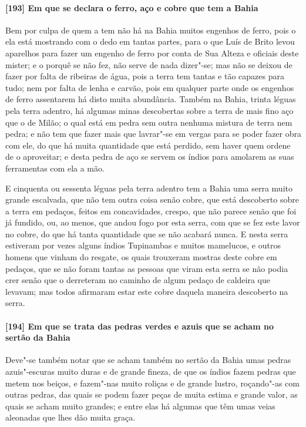 \begin{linenumbers}
\paragraph{[193] Em que se declara o ferro, aço e cobre que tem a Bahia}\quad
Bem por culpa de quem a tem não há na Bahia muitos engenhos de ferro, pois o ela está
mostrando com o dedo em tantas partes, para o que Luís de Brito levou aparelhos para fazer
um engenho de ferro por conta de Sua Alteza e oficiais deste mister; e o porquê se não
fez, não serve de nada dizer"-se; mas não se deixou de fazer por falta de ribeiras de água,
pois a terra tem tantas e tão capazes para tudo; nem por falta de lenha e carvão, pois em
qualquer parte onde os engenhos de ferro assentarem há disto muita abundância. Também na
Bahia, trinta léguas pela terra adentro, há algumas minas descobertas sobre a terra de
mais fino aço que o de Milão; o qual está em pedra sem outra nenhuma mistura de terra nem
pedra; e não tem que fazer mais que lavrar"-se em vergas para se poder fazer obra com ele,
do que há muita quantidade que está perdido, sem haver quem ordene de o aproveitar; e
desta pedra de aço se servem os índios para amolarem as suas ferramentas com ela a mão.

E cinquenta ou sessenta léguas pela terra adentro tem a Bahia uma serra muito grande
escalvada, que não tem outra coisa senão cobre, que está descoberto sobre a terra em
pedaços, feitos em concavidades, crespo, que não parece senão que foi já fundido, ou, ao
menos, que andou fogo por esta serra, com que se fez este lavor no cobre, do que há tanta
quantidade que se não acabará nunca. E nesta serra estiveram por vezes alguns índios
Tupinambas e muitos mamelucos, e outros homens que vinham do resgate, os quais trouxeram
mostras deste cobre em pedaços, que se não foram tantas as pessoas que viram esta serra se
não podia crer senão que o derreteram no caminho de algum pedaço de caldeira que levavam;
mas todos afirmaram estar este cobre daquela maneira descoberto na serra.

\paragraph{[194] Em que se trata das pedras verdes e azuis que se acham no sertão da Bahia}\quad
Deve"-se também notar que se acham também no sertão da Bahia umas pedras azuis"-escuras
muito duras e de grande fineza, de que os índios fazem pedras que metem nos beiços, e
fazem"-nas muito roliças e de grande lustro, roçando"-as com outras pedras, das quais se
podem fazer peças de muita estima e grande valor, as quais se acham muito grandes; e entre
elas há algumas que têm umas veias aleonadas que lhes dão muita graça.


\end{linenumbers}

